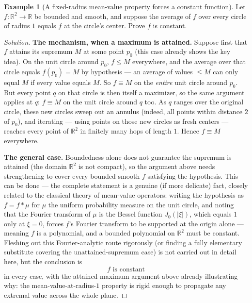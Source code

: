 \documentclass[11pt]{article}
\theoremstyle{definition}
\newtheorem{example}{Example}[section]
\newcommand{\R}{\mathbb{R}}
\begin{document}
\begin{example}[A fixed-radius mean-value property forces a constant function]
Let $f:\R^2\to\R$ be bounded and smooth, and suppose the average of $f$ over every circle of radius $1$ equals $f$ at the circle's center. Prove $f$ is constant.
\end{example}

\begin{proof}[Solution]
\textbf{The mechanism, when a maximum is attained.} Suppose first that $f$ attains its supremum $M$ at some point $p_0$ (this case already shows the key idea). On the unit circle around $p_0$, $f\le M$ everywhere, and the average over that circle equals $f(p_0)=M$ by hypothesis — an average of values $\le M$ can only equal $M$ if every value equals $M$. So $f\equiv M$ on the \emph{entire} unit circle around $p_0$. But every point $q$ on that circle is then itself a maximizer, so the same argument applies at $q$: $f\equiv M$ on the unit circle around $q$ too. As $q$ ranges over the original circle, these new circles sweep out an annulus (indeed, all points within distance $2$ of $p_0$), and iterating — using points on those new circles as fresh centers — reaches every point of $\R^2$ in finitely many hops of length $1$. Hence $f\equiv M$ everywhere.

\textbf{The general case.} Boundedness alone does not guarantee the supremum is attained (the domain $\R^2$ is not compact), so the argument above needs strengthening to cover every bounded smooth $f$ satisfying the hypothesis. This can be done — the complete statement is a genuine (if more delicate) fact, closely related to the classical theory of mean-value operators: writing the hypothesis as $f=f*\mu$ for $\mu$ the uniform probability measure on the unit circle, and noting that the Fourier transform of $\mu$ is the Bessel function $J_0(|\xi|)$, which equals $1$ only at $\xi=0$, forces $f$'s Fourier transform to be supported at the origin alone — meaning $f$ is a polynomial, and a bounded polynomial on $\R^2$ must be constant. Fleshing out this Fourier-analytic route rigorously (or finding a fully elementary substitute covering the unattained-supremum case) is not carried out in detail here, but the conclusion is
\[
\boxed{f \text{ is constant}}
\]
in every case, with the attained-maximum argument above already illustrating why: the mean-value-at-radius-$1$ property is rigid enough to propagate any extremal value across the whole plane.
\end{proof}
\end{document}
